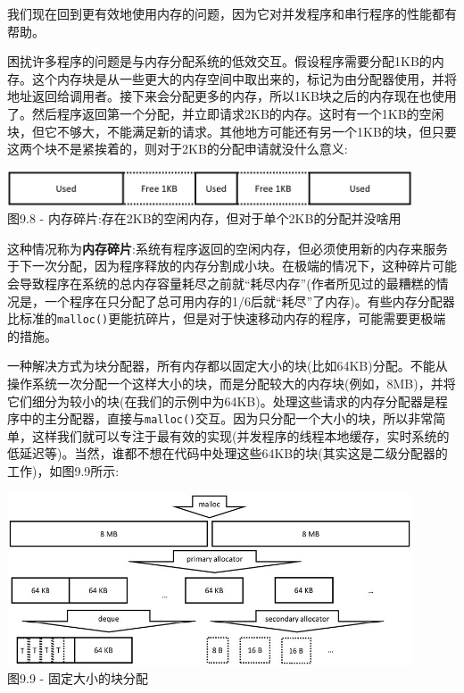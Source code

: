 我们现在回到更有效地使用内存的问题，因为它对并发程序和串行程序的性能都有帮助。


困扰许多程序的问题是与内存分配系统的低效交互。假设程序需要分配1KB的内存。这个内存块是从一些更大的内存空间中取出来的，标记为由分配器使用，并将地址返回给调用者。接下来会分配更多的内存，所以1KB块之后的内存现在也使用了。然后程序返回第一个分配，并立即请求2KB的内存。这时有一个1KB的空闲块，但它不够大，不能满足新的请求。其他地方可能还有另一个1KB的块，但只要这两个块不是紧挨着的，则对于2KB的分配申请就没什么意义:

\begin{center}
\includegraphics[width=0.9\textwidth]{content/3/chapter9/images/8.jpg}\\
图9.8 - 内存碎片:存在2KB的空闲内存，但对于单个2KB的分配并没啥用
\end{center}

这种情况称为\textbf{内存碎片}:系统有程序返回的空闲内存，但必须使用新的内存来服务于下一次分配，因为程序释放的内存分割成小块。在极端的情况下，这种碎片可能会导致程序在系统的总内存容量耗尽之前就“耗尽内存”(作者所见过的最糟糕的情况是，一个程序在只分配了总可用内存的1/6后就“耗尽”了内存)。有些内存分配器比标准的\texttt{malloc()}更能抗碎片，但是对于快速移动内存的程序，可能需要更极端的措施。

一种解决方式为块分配器，所有内存都以固定大小的块(比如64KB)分配。不能从操作系统一次分配一个这样大小的块，而是分配较大的内存块(例如，8MB)，并将它们细分为较小的块(在我们的示例中为64KB)。处理这些请求的内存分配器是程序中的主分配器，直接与\texttt{malloc()}交互。因为只分配一个大小的块，所以非常简单，这样我们就可以专注于最有效的实现(并发程序的线程本地缓存，实时系统的低延迟等)。当然，谁都不想在代码中处理这些64KB的块(其实这是二级分配器的工作)，如图9.9所示:

\begin{center}
\includegraphics[width=0.9\textwidth]{content/3/chapter9/images/9.jpg}\\
图9.9 - 固定大小的块分配
\end{center}

